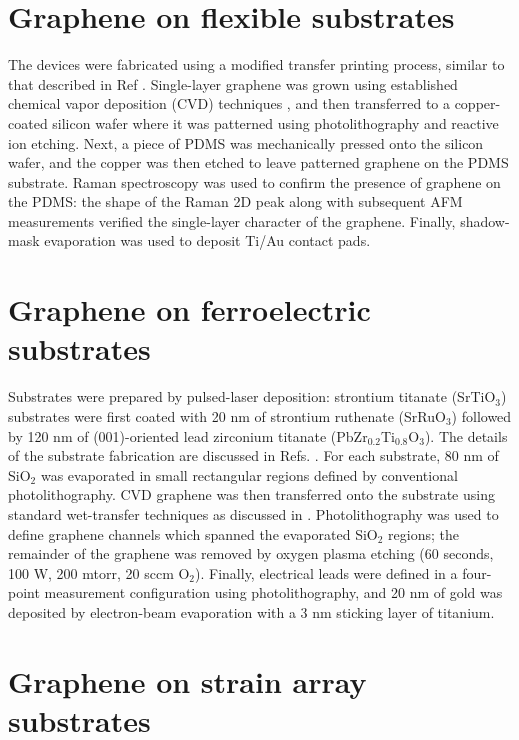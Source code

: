 \documentclass[edeposit,fullpage,draftthesis]{uiucthesis2009}
\begin{document}
\begin{appendices}
\section{Graphene on flexible substrates}
   
        The devices were fabricated using a modified transfer
        printing process, similar to that described in Ref \cite{Kim2009}.
        Single-layer graphene was grown using established chemical vapor deposition
        (CVD) techniques \cite{Li2009}, and then transferred to a copper-coated silicon
        wafer where it was patterned using photolithography and reactive ion etching.
        Next, a piece of PDMS was mechanically pressed onto the silicon wafer, and the
        copper was then etched to leave patterned graphene on the PDMS
        substrate\cite{Lee2010}. Raman spectroscopy was used to confirm the presence of
        graphene on the PDMS: the shape of the Raman 2D
        peak\cite{Ferrari2006} along with subsequent AFM measurements verified the
        single-layer character of the graphene. Finally, shadow-mask evaporation was
        used to deposit Ti/Au contact pads.

\section{Graphene on ferroelectric substrates}

Substrates were prepared by pulsed-laser deposition: strontium titanate (SrTiO$_3$) substrates were first coated with 20 nm of strontium ruthenate (SrRuO$_3$) followed by 120 nm of (001)-oriented lead zirconium titanate (PbZr$_{0.2}$Ti$_{0.8}$O$_3$). The details of the substrate fabrication are discussed in Refs. 
\cite{Xu2014,Karthik2012}.
For each substrate, 80 nm of SiO$_2$ was evaporated in small rectangular regions defined by conventional photolithography. CVD graphene was then transferred onto the substrate using standard wet-transfer techniques as discussed in \cite{Li2009}.
Photolithography was used to define graphene channels which spanned the evaporated SiO$_2$ regions; 
the remainder of the graphene was removed by oxygen plasma etching (60 seconds, 100 W, 200 mtorr, 20 sccm O$_2$). 
Finally, electrical leads were defined in a four-point measurement configuration using photolithography, and 20 nm of gold was deposited by electron-beam evaporation with a 3 nm sticking layer of titanium.

\section{Graphene on strain array substrates}


\end{appendices}
\end{document}
